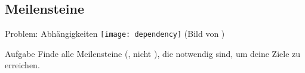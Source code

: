 %
%
%


\subsection{Meilensteine}


\begin{frame}[c]{Problem: Abhängigkeiten}
    \normalsize
    \texttt{[image: dependency]}
    (Bild von \cite{dependency-pic})
\end{frame}



\begin{frame}[c]
    \begin{block}{Aufgabe}
        Finde alle Meilensteine (, nicht ), die
        notwendig sind, um deine Ziele zu erreichen.
    \end{block}
\end{frame}


%
%
%



